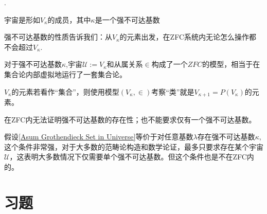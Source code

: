 \begin{Them}[宇宙是层垒谱系中强不可达基数的序数成员].

    宇宙是形如$V_{\kappa}$的成员，其中$\kappa$是一个强不可达基数
\end{Them}
    强不可达基数的性质告诉我们：从$V_{\kappa}$的元素出发，在ZFC系统内无论怎么操作都不会超过$V_{\kappa}$.

    对于强不可达基数$\kappa$,宇宙$\mathcal{U}:=V_{\kappa}$和从属关系$\in$构成了一个$ZFC$的模型，相当于在集合论内部虚拟地运行了一套集合论。

    $V_{\kappa}$的元素若看作“集合”，则使用模型$(V_{\kappa},\in)$考察“类”就是$V_{\kappa+1}=P(V_{\kappa})$的元素。

\begin{Rmk}在ZFC内无法证明强不可达基数的存在性；也不能要求仅有一个强不可达基数。

    假设\ref{Asum Grothendieck Set in Universe}等价于对任意基数$\lambda$存在强不可达基数$\kappa$,这个条件非常强，对于大多数的范畴论构造和数学论证，最多只要求存在某个宇宙$\mathcal{U}$，这表明大多数情况下仅需要单个强不可达基数。但这个条件也是不在ZFC内的。
\end{Rmk}

\section{习题}